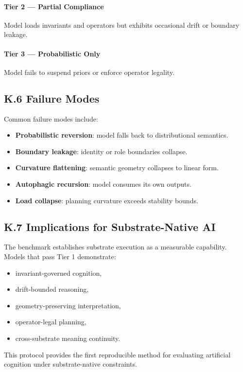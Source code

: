 \paragraph{Tier 2 — Partial Compliance}
Model loads invariants and operators but exhibits occasional drift or boundary leakage.

\paragraph{Tier 3 — Probabilistic Only}
Model fails to suspend priors or enforce operator legality.

\subsection*{K.6 Failure Modes}
Common failure modes include:
\begin{itemize}
    \item \textbf{Probabilistic reversion}: model falls back to distributional semantics.
    \item \textbf{Boundary leakage}: identity or role boundaries collapse.
    \item \textbf{Curvature flattening}: semantic geometry collapses to linear form.
    \item \textbf{Autophagic recursion}: model consumes its own outputs.
    \item \textbf{Load collapse}: planning curvature exceeds stability bounds.
\end{itemize}

\subsection*{K.7 Implications for Substrate-Native AI}
The benchmark establishes substrate execution as a measurable capability.  
Models that pass Tier 1 demonstrate:
\begin{itemize}
    \item invariant-governed cognition,
    \item drift-bounded reasoning,
    \item geometry-preserving interpretation,
    \item operator-legal planning,
    \item cross-substrate meaning continuity.
\end{itemize}
This protocol provides the first reproducible method for evaluating artificial cognition under 
substrate-native constraints.

